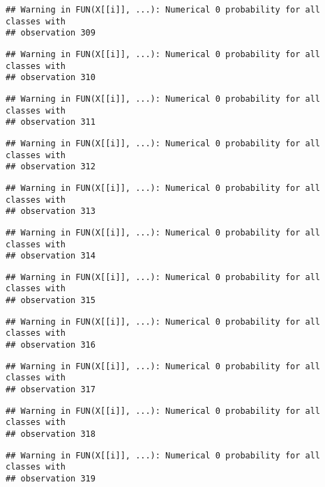 \documentclass[
]{article}
\begin{document}
\begin{verbatim}
## Warning in FUN(X[[i]], ...): Numerical 0 probability for all classes with
## observation 309
\end{verbatim}

\begin{verbatim}
## Warning in FUN(X[[i]], ...): Numerical 0 probability for all classes with
## observation 310
\end{verbatim}

\begin{verbatim}
## Warning in FUN(X[[i]], ...): Numerical 0 probability for all classes with
## observation 311
\end{verbatim}

\begin{verbatim}
## Warning in FUN(X[[i]], ...): Numerical 0 probability for all classes with
## observation 312
\end{verbatim}

\begin{verbatim}
## Warning in FUN(X[[i]], ...): Numerical 0 probability for all classes with
## observation 313
\end{verbatim}

\begin{verbatim}
## Warning in FUN(X[[i]], ...): Numerical 0 probability for all classes with
## observation 314
\end{verbatim}

\begin{verbatim}
## Warning in FUN(X[[i]], ...): Numerical 0 probability for all classes with
## observation 315
\end{verbatim}

\begin{verbatim}
## Warning in FUN(X[[i]], ...): Numerical 0 probability for all classes with
## observation 316
\end{verbatim}

\begin{verbatim}
## Warning in FUN(X[[i]], ...): Numerical 0 probability for all classes with
## observation 317
\end{verbatim}

\begin{verbatim}
## Warning in FUN(X[[i]], ...): Numerical 0 probability for all classes with
## observation 318
\end{verbatim}

\begin{verbatim}
## Warning in FUN(X[[i]], ...): Numerical 0 probability for all classes with
## observation 319
\end{verbatim}
\end{document}
